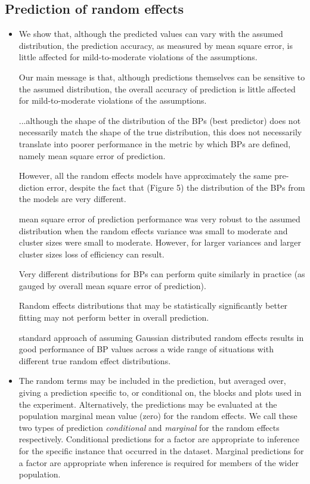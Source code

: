 \documentclass{article}
\begin{document}
\subsection*{Prediction of random effects}%
\begin{itemize}
\item \cite{mcculloch2011prediction} We show that, although the predicted values can vary with the assumed distribution, the prediction accuracy, as measured by mean square error, is little affected for mild-to-moderate violations of the assumptions.\par

Our main message is that, although predictions themselves can be sensitive to the assumed distribution, the overall accuracy of prediction is little affected for mild-to-moderate violations of the assumptions.\par 

...although the shape of the distribution of the BPs (best predictor) does not necessarily match the shape of the true distribution, this does not necessarily translate into poorer performance in the metric by which BPs are defined, namely mean square error of prediction.\par

However, all the random effects models have approximately the same pre- diction error, despite the fact that (Figure 5) the distribution of the BPs from the models are very different.\par

mean square error of prediction performance was very robust to the assumed distribution when the random effects variance was small to moderate and cluster sizes were small to moderate. However, for larger variances and larger cluster sizes loss of efficiency can result.\par

Very different distributions for BPs can perform quite similarly in practice (as gauged by overall mean square error of prediction).\par

Random effects distributions that may be statistically significantly better fitting may not perform better in overall prediction.\par

standard approach of assuming Gaussian distributed random effects results in good performance of BP values across a wide range of situations with different true random effect distributions.


\item \cite{welham2004prediction} The random terms may be included in the prediction, but averaged over, giving a prediction specific to, or conditional on, the blocks and plots used in the experiment. Alternatively, the predictions may be evaluated at the population marginal mean value (zero) for the random effects. We call these two types of prediction {\em conditional} and {\em marginal} for the random effects respectively. Conditional predictions for a factor are appropriate to inference for the specific instance that occurred in the dataset. Marginal predictions for a factor are appropriate when inference is required for members of the wider population. \par


\end{itemize}
\end{document}
